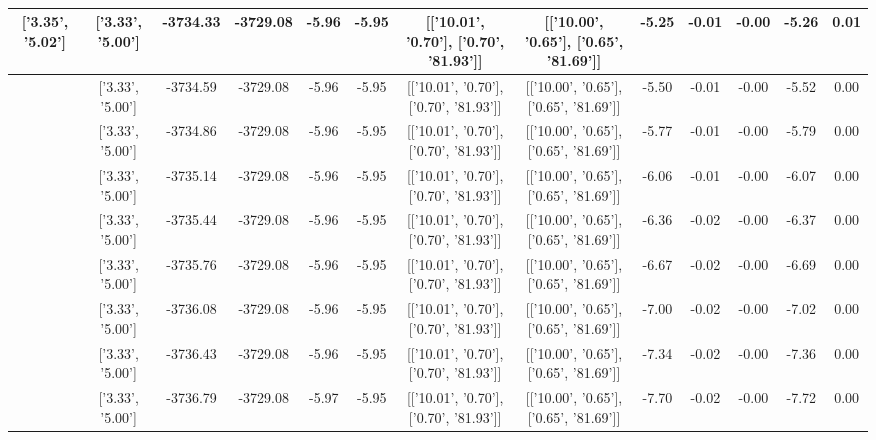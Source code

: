 \begin{table}[htbp]
\begin{adjustbox}{angle=90}
\begin{tabular}{|c|c|c|c|c|c|c|c|c|c|c|c|c|}
 ['3.35', '5.02'] & ['3.33', '5.00'] & -3734.33 & -3729.08 & -5.96 & -5.95 & [['10.01', '0.70'], ['0.70', '81.93']] & [['10.00', '0.65'], ['0.65', '81.69']] & -5.25 & -0.01 & -0.00 & -5.26 & 0.01\\ \hline
 ['3.35', '5.02'] & ['3.33', '5.00'] & -3734.59 & -3729.08 & -5.96 & -5.95 & [['10.01', '0.70'], ['0.70', '81.93']] & [['10.00', '0.65'], ['0.65', '81.69']] & -5.50 & -0.01 & -0.00 & -5.52 & 0.00\\ \hline
 ['3.35', '5.02'] & ['3.33', '5.00'] & -3734.86 & -3729.08 & -5.96 & -5.95 & [['10.01', '0.70'], ['0.70', '81.93']] & [['10.00', '0.65'], ['0.65', '81.69']] & -5.77 & -0.01 & -0.00 & -5.79 & 0.00\\ \hline
 ['3.35', '5.02'] & ['3.33', '5.00'] & -3735.14 & -3729.08 & -5.96 & -5.95 & [['10.01', '0.70'], ['0.70', '81.93']] & [['10.00', '0.65'], ['0.65', '81.69']] & -6.06 & -0.01 & -0.00 & -6.07 & 0.00\\ \hline
 ['3.35', '5.02'] & ['3.33', '5.00'] & -3735.44 & -3729.08 & -5.96 & -5.95 & [['10.01', '0.70'], ['0.70', '81.93']] & [['10.00', '0.65'], ['0.65', '81.69']] & -6.36 & -0.02 & -0.00 & -6.37 & 0.00\\ \hline
 ['3.36', '5.02'] & ['3.33', '5.00'] & -3735.76 & -3729.08 & -5.96 & -5.95 & [['10.01', '0.70'], ['0.70', '81.93']] & [['10.00', '0.65'], ['0.65', '81.69']] & -6.67 & -0.02 & -0.00 & -6.69 & 0.00\\ \hline
 ['3.36', '5.02'] & ['3.33', '5.00'] & -3736.08 & -3729.08 & -5.96 & -5.95 & [['10.01', '0.70'], ['0.70', '81.93']] & [['10.00', '0.65'], ['0.65', '81.69']] & -7.00 & -0.02 & -0.00 & -7.02 & 0.00\\ \hline
 ['3.36', '5.02'] & ['3.33', '5.00'] & -3736.43 & -3729.08 & -5.96 & -5.95 & [['10.01', '0.70'], ['0.70', '81.93']] & [['10.00', '0.65'], ['0.65', '81.69']] & -7.34 & -0.02 & -0.00 & -7.36 & 0.00\\ \hline
 ['3.36', '5.02'] & ['3.33', '5.00'] & -3736.79 & -3729.08 & -5.97 & -5.95 & [['10.01', '0.70'], ['0.70', '81.93']] & [['10.00', '0.65'], ['0.65', '81.69']] & -7.70 & -0.02 & -0.00 & -7.72 & 0.00\\ \hline
            \end{tabular}
        \end{adjustbox}
        \caption{}
        \label{}
    \end{table}
    